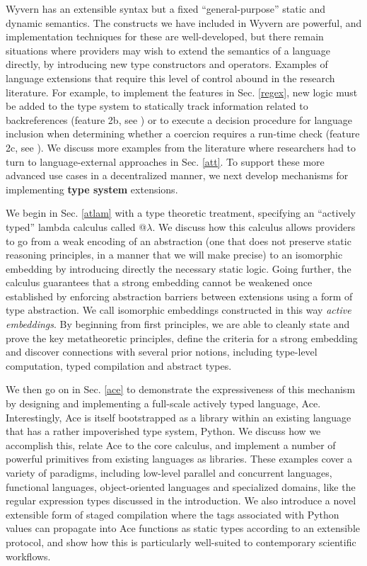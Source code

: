 Wyvern has an extensible syntax but a fixed ``general-purpose'' static and dynamic semantics. The  constructs we have included in Wyvern are powerful, and implementation techniques for these are well-developed, but there remain situations where providers may wish to extend the {semantics} of a language directly, by introducing new type constructors and operators. Examples of language extensions that require this level of control abound in the research literature. For example, to implement the features in Sec. \ref{regex}, new logic must be added to the type system to statically track information related to backreferences (feature 2b, see \cite{spishak2012type}) or to execute a decision procedure for language inclusion when determining whether a coercion requires a run-time check (feature 2c, see \cite{fulton-thesis}). We discuss more examples from the literature where researchers had to turn to language-external approaches in Sec. \ref{att}. To support these more advanced use cases in a decentralized manner, we next develop mechanisms for implementing \textbf{type system} extensions. 

We begin in Sec. \ref{atlam} with a type theoretic treatment, specifying an ``actively typed'' lambda calculus called @$\lambda$. We discuss how this calculus allows providers to go from a weak encoding of an abstraction (one that does not preserve static reasoning principles, in a manner that we will make precise) to an isomorphic embedding by introducing directly the necessary static logic. Going further, the calculus guarantees that a strong embedding cannot be weakened once established by enforcing abstraction barriers between extensions using a form of type abstraction. We call isomorphic embeddings constructed in this way \emph{active embeddings}. By beginning from first principles, we are able to cleanly state and prove the key metatheoretic principles, define the criteria for a strong embedding and discover connections with several prior notions, including type-level computation, typed compilation and abstract types. 

We then go on in Sec. \ref{ace} to demonstrate the expressiveness of this mechanism by designing and implementing a full-scale actively typed language, Ace. Interestingly, Ace is itself bootstrapped as a library within an existing language that has a rather impoverished type system, Python. We discuss how we accomplish this, relate Ace to the core calculus, and implement a number of powerful primitives from existing languages as libraries. These examples cover a variety of paradigms, including low-level parallel and concurrent languages, functional languages, object-oriented languages and specialized domains, like the regular expression types discussed in the introduction. We also introduce a novel extensible form of staged compilation where the tags associated with Python values can propagate into Ace functions as static types according to an extensible protocol, and show how this is particularly well-suited to contemporary scientific workflows.

